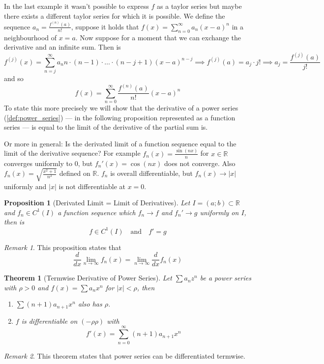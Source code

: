 \documentclass[english,titlepage]{uzhpub}
\theoremstyle{definition}
\theoremstyle{plain}
\newtheorem{proposition}[definition]{Proposition}
\newtheorem{theorem}[definition]{Theorem} %
\theoremstyle{remark}
\newtheorem*{remark}{Remark}
\theoremstyle{example}
\begin{document}
   In the last example it wasn't possible to express \(f\) as a taylor series but maybe there exists a different taylor series for which it is possible.
   We define the sequence \(a_n = \frac{f^{(n)}(a)}{n!}\), suppose it holds that \(f(x) = \sum_{n=0}^\infty a_n (x-a)^n\) in a neighbourhood of \(x = a\).
   Now suppose for a moment that we can exchange the derivative and an infinite sum.
   Then is
   \[f^{(j)}(x) = \sum_{n=j}^\infty a_n n \cdot (n-1) \cdot \ldots \cdot (n-j+1)(x-a)^{n-j} \implies f^{(j)}(a) = a_j \cdot j! \implies a_j = \frac{f^{(j)}(a)}{j!}\]
   and so
   \[f(x) = \sum_{n=0}^\infty \frac{f^{(n)}(a)}{n!} (x-a)^n\]
   To state this more precisely we will show that the derivative of a power series (\ref{def:power_series}) --- in the following proposition represented as a function series --- is equal to the limit of the derivative of the partial sum is.

   Or more in general: Is the derivated limit of a function sequence equal to the limit of the derivative sequence?
   For example \(f_n(x) = \frac{\sin(nx)}{n}\) for \(x \in \mathbb{R}\) converges uniformly to 0, but \(f_n'(x) = \cos(nx)\) does not converge.
   Also \(f_n(x) = \sqrt{\frac{x^2 + 1}{n^2}}\) defined on \(\mathbb{R}\).
   \(f_n\) is overall differentiable, but \(f_n(x) \to |x|\) uniformly and \(|x|\) is not differentiable at \(x=0\).

   \begin{proposition}[Derivated Limit = Limit of Derivatives]\label{pro:deriv_limit=limit_deriv}
      Let \(I = (a;b) \subset \mathbb{R}\) and \(f_n \in C^1(I)\) a function sequence which \(f_n \to f\) and \(f_n' \to g\) uniformly on \(I\), then is
      \[f \in C^1(I) \quad\text{and}\quad f' = g\]
   \end{proposition}
   \begin{remark}
      This proposition states that
      \[\frac{d}{dx} \lim_{n \to \infty} f_n(x) = \lim_{n \to \infty} \frac{d}{dx}f_n(x)\]
   \end{remark}

   \begin{theorem}[Termwise Derivative of Power Series]\label{thm:power_series_derivative}
      Let \(\sum a_n z^n\) be a power series with \(\rho > 0\) and \(f(x) = \sum a_n x^n\) for \(|x| < \rho\), then
      \begin{enumerate}
         \item \(\sum (n+1)a_{n+1}x^n\) also has \(\rho\).
         \item \(f\) is differentiable on \((-\rho \rho)\) with
            \[f'(x) = \sum_{n=0}^\infty (n+1)a_{n+1}x^n\]
      \end{enumerate}
   \end{theorem}
   \begin{remark}
      This theorem states that power series can be differentiated termwise.
   \end{remark}
\end{document}
